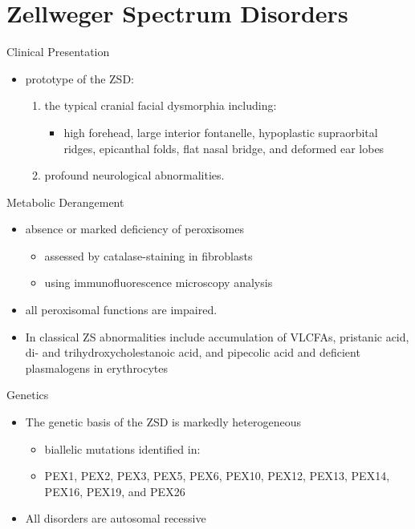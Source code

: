 \documentclass[presentation, smaller]{beamer}
\begin{document}
\section{Zellweger Spectrum Disorders}
\label{sec:org24d5be8}
\begin{frame}[label={sec:org68112c1}]{Clinical Presentation}
\begin{itemize}
\item prototype of the ZSD:
\begin{enumerate}
\item the typical cranial facial dysmorphia including:
\begin{itemize}
\item high forehead, large interior fontanelle, hypoplastic
supraorbital ridges, epicanthal folds, flat nasal bridge, and
deformed ear lobes
\end{itemize}
\item profound neurological abnormalities.
\end{enumerate}
\end{itemize}
\end{frame}

\begin{frame}[label={sec:org80b4ddf}]{Metabolic Derangement}
\begin{itemize}
\item absence or marked deficiency of peroxisomes
\begin{itemize}
\item assessed by catalase-staining in fibroblasts
\item using immunofluorescence microscopy analysis
\end{itemize}
\item all peroxisomal functions are impaired.
\item In classical ZS abnormalities include accumulation of VLCFAs,
pristanic acid, di- and trihydroxycholestanoic acid, and pipecolic
acid and deficient plasmalogens in erythrocytes
\end{itemize}
\end{frame}

\begin{frame}[label={sec:orgf5c4069}]{Genetics}
\begin{itemize}
\item The genetic basis of the ZSD is markedly heterogeneous
\begin{itemize}
\item biallelic mutations identified in:
\item PEX1, PEX2, PEX3, PEX5, PEX6, PEX10, PEX12, PEX13, PEX14, PEX16, PEX19, and PEX26
\end{itemize}
\item All disorders are autosomal recessive
\end{itemize}
\end{frame}
\end{document}
